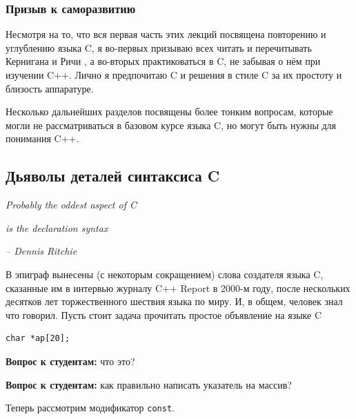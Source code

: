 \documentclass[a4paper,12pt,oneside]{article}
\newif\ifanswers
\begin{document}
\subsubsection{Призыв к саморазвитию}

Несмотря на то, что вся первая часть этих лекций посвящена повторению и углублению языка C, я во-первых призываю всех читать и перечитывать Кернигана и Ричи \cite{ritchie}, а во-вторых практиковаться в C, не забывая о нём при изучении C++. Лично я предпочитаю C и решения в стиле C за их простоту и близость аппаратуре.

Несколько дальнейших разделов посвящены более тонким вопросам, которые могли не рассматриваться в базовом курсе языка C, но могут быть нужны для понимания C++.

\pagebreak
\subsection{Дьяволы деталей синтаксиса C}\label{DevilDetails}

\hfill\textit{Probably the oddest aspect of C}

\hfill\textit{is the declaration syntax}{\vspace{0.5em}}

\hfill\textit{-- Dennis Ritchie}

В эпиграф вынесены (с некоторым сокращением) слова создателя языка C, сказанные им в интервью журналу C++ Report в 2000-м году, после нескольких десятков лет торжественного шествия языка по миру. И, в общем, человек знал что говорил. Пусть стоит задача прочитать простое объявление на языке C

% 
\begin{lstlisting}
char *ap[20];
\end{lstlisting}

\textbf{Вопрос к студентам:} что это? 

\ifanswers
Ответ: да, это массив указателей\index{Array of pointers}. 
\fi

\textbf{Вопрос к студентам:} как правильно написать указатель на массив?

\ifanswers
Ответ\index{Pointer to array}:

\begin{lstlisting}
char (*pa)[20];
\end{lstlisting}
\fi

Теперь рассмотрим модификатор \lstinline!const!. 
\end{document}

